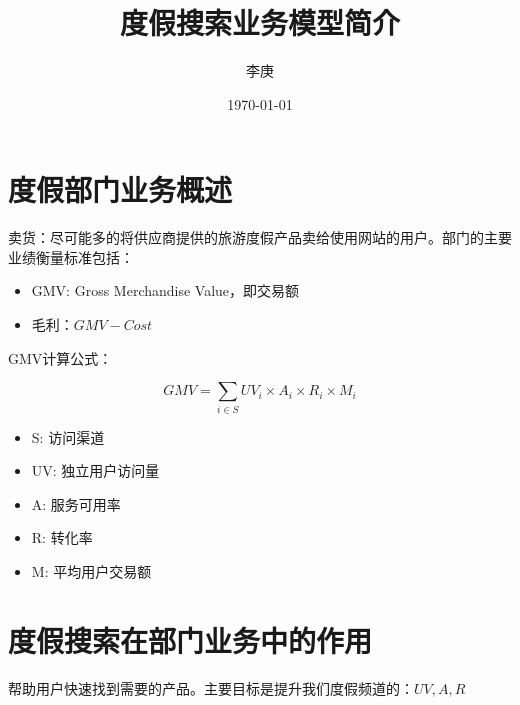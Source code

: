 \documentclass{article}
\begin{document}
\begin{CJK}{UTF8}{gbsn}

\title{度假搜索业务模型简介}
\author{李庚}
\date{\today}



\maketitle
\tableofcontents

\section{度假部门业务概述}

卖货：尽可能多的将供应商提供的旅游度假产品卖给使用网站的用户。部门的主要业绩衡量标准包括：

\begin{itemize}
  \item { GMV: Gross Merchandise Value，即交易额 }
  \item { 毛利：$GMV - Cost$ }
\end{itemize}


GMV计算公式：

\begin{equation}
  GMV = \sum_{i \in S}{UV_i \times A_i \times R_i \times M_i}
\end{equation}

\begin{itemize}
  \item { S: 访问渠道 }
  \item { UV: 独立用户访问量 }
  \item { A: 服务可用率 }
  \item { R: 转化率 }
  \item { M: 平均用户交易额 }
\end{itemize}
    

\section{度假搜索在部门业务中的作用}

帮助用户快速找到需要的产品。主要目标是提升我们度假频道的：$ UV, A, R $



\clearpage
\end{CJK}
\end{document}
